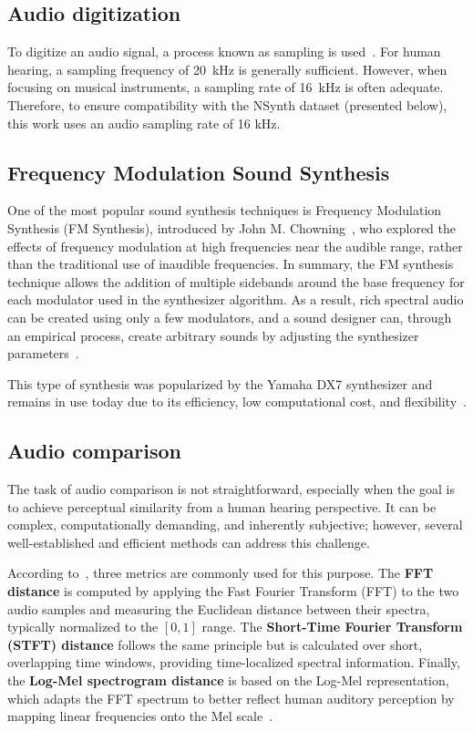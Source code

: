 \documentclass[10pt,conference]{IEEEtran}
\begin{document}
\subsection{Audio digitization}

To digitize an audio signal, a process known as sampling is used~\cite{po2022sampling}. For human hearing, a sampling frequency of 20~kHz is generally sufficient. However, when focusing on musical instruments, a sampling rate of 16~kHz is often adequate. Therefore, to ensure compatibility with the NSynth dataset (presented below), this work uses an audio sampling rate of 16 kHz.

\subsection{Frequency Modulation Sound Synthesis}

One of the most popular sound synthesis techniques is Frequency Modulation Synthesis (FM Synthesis), introduced by John M. Chowning~\cite{chowning1973synthesis}, who explored the effects of frequency modulation at high frequencies near the audible range, rather than the traditional use of inaudible frequencies. In summary, the FM synthesis technique allows the addition of multiple sidebands around the base frequency for each modulator used in the synthesizer algorithm. As a result, rich spectral audio can be created using only a few modulators, and a sound designer can, through an empirical process, create arbitrary sounds by adjusting the synthesizer parameters~\cite{lazzarini2023higherorder}.

This type of synthesis was popularized by the Yamaha DX7 synthesizer and remains in use today due to its efficiency, low computational cost, and flexibility~\cite{steinmetz2022ddx7}.

\subsection{Audio comparison}

The task of audio comparison is not straightforward, especially when the goal is to achieve perceptual similarity from a human hearing perspective. It can be complex, computationally demanding, and inherently subjective; however, several well-established and efficient methods can address this challenge.

According to~\cite{claesson2021resynthesis}, three metrics are commonly used for this purpose. The \textbf{FFT distance} is computed by applying the Fast Fourier Transform (FFT) to the two audio samples and measuring the Euclidean distance between their spectra, typically normalized to the $[0,1]$ range. The \textbf{Short-Time Fourier Transform (STFT) distance} follows the same principle but is calculated over short, overlapping time windows, providing time-localized spectral information. Finally, the \textbf{Log-Mel spectrogram distance} is based on the Log-Mel representation, which adapts the FFT spectrum to better reflect human auditory perception by mapping linear frequencies onto the Mel scale~\cite{claesson2021resynthesis,chulev2024improving}.
\end{document}
